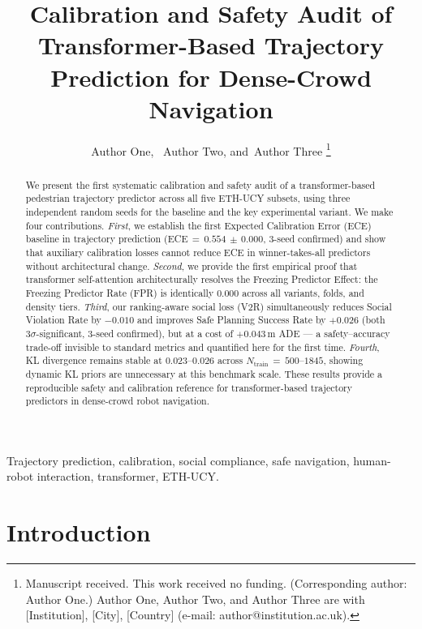 \documentclass[journal]{IEEEtran}
\title{Calibration and Safety Audit of Transformer-Based
       Trajectory Prediction for Dense-Crowd Navigation}
\author{Author One,~\IEEEmembership{Member,~IEEE,}
        Author Two,
        and~Author Three
\thanks{Manuscript received. This work received no funding. (Corresponding author: Author One.) Author One, Author Two, and Author Three are with [Institution], [City], [Country] (e-mail: author@institution.ac.uk).}}
\begin{document}
\maketitle


\begin{abstract}
We present the first systematic calibration and safety audit of a
transformer-based pedestrian trajectory predictor across all five
ETH-UCY subsets, using three independent random seeds for the
baseline and the key experimental variant.
We make four contributions.
\emph{First}, we establish the first Expected Calibration Error (ECE)
baseline in trajectory prediction (ECE\,\(=\,0.554\,\pm\,0.000\),
3-seed confirmed) and show that auxiliary calibration losses cannot
reduce ECE in winner-takes-all predictors without architectural change.
\emph{Second}, we provide the first empirical proof that transformer
self-attention architecturally resolves the Freezing Predictor Effect:
the Freezing Predictor Rate (FPR) is identically 0.000 across all
variants, folds, and density tiers.
\emph{Third}, our ranking-aware social loss (V2R) simultaneously
reduces Social Violation Rate by \(-0.010\) and improves Safe Planning
Success Rate by \(+0.026\) (both \(3\sigma\)-significant, 3-seed
confirmed), but at a cost of \(+0.043\)\,m ADE --- a safety--accuracy
trade-off invisible to standard metrics and quantified here for the
first time.
\emph{Fourth}, KL divergence remains stable at \(0.023\)--\(0.026\)
across \(N_{\text{train}}\,{=}\,500\)--\(1845\), showing dynamic KL
priors are unnecessary at this benchmark scale.
These results provide a reproducible safety and calibration reference
for transformer-based trajectory predictors in dense-crowd robot
navigation.
\end{abstract}

\begin{IEEEkeywords}
Trajectory prediction, calibration, social compliance, safe navigation,
human-robot interaction, transformer, ETH-UCY.
\end{IEEEkeywords}

\section{Introduction}
\label{sec:intro}
\end{document}
